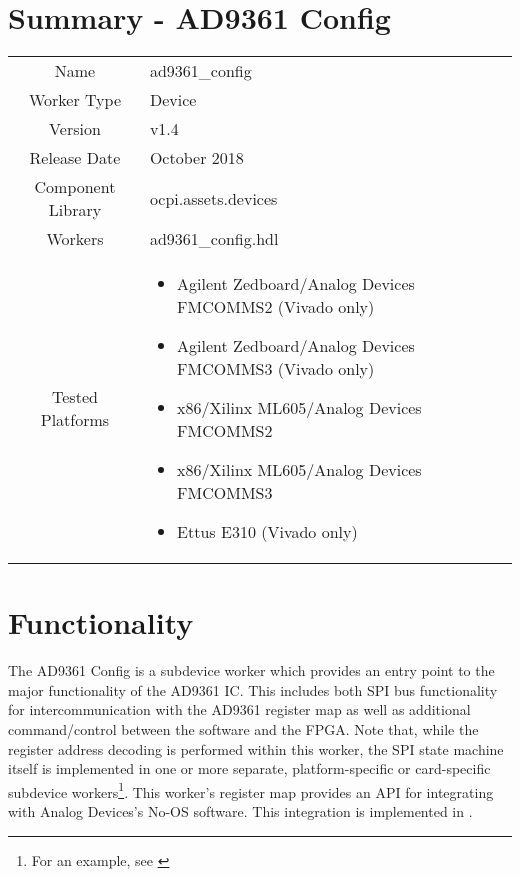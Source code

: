 \documentclass{article}
\author{} %
\date{Version \docVersion} %
\title{\docTitle}
\def\docVersion{1.4}
\def\comp{ad9361\_config}
\def\Comp{AD9361 Config}
\begin{document}
\section*{Summary - \Comp}
\begin{tabular}{|c|M{13.5cm}|}
  \hline
                    &                  \\
  \hline
  Name              & \comp            \\
  \hline
  Worker Type       & Device           \\
  \hline
  Version           & v\docVersion{}   \\
  \hline
  Release Date      & October 2018         \\
  \hline
  Component Library & ocpi.assets.devices     \\
  \hline
  Workers           & \comp.hdl        \\
  \hline
	Tested Platforms  &
\begin{itemize}
  \item Agilent Zedboard/Analog Devices FMCOMMS2 (Vivado only)
  \item Agilent Zedboard/Analog Devices FMCOMMS3 (Vivado only)
  \item x86/Xilinx ML605/Analog Devices FMCOMMS2
  \item x86/Xilinx ML605/Analog Devices FMCOMMS3
  \item Ettus E310 (Vivado only)
\end{itemize} \\
  \hline
\end{tabular}

\section*{Functionality}
  The \Comp{} is a subdevice worker which provides an entry point to the major functionality of the AD9361 IC\cite{ad9361}. This includes both SPI bus functionality for intercommunication with the AD9361 register map as well as additional command/control between the software and the FPGA. Note that, while the register address decoding is performed within this worker, the SPI state machine itself is implemented in one or more separate, platform-specific or card-specific subdevice workers\footnote{For an example, see \cite{spi_comp_datasheet}}. This worker's register map provides an API for integrating with Analog Devices's No-OS software\cite{no_os}. This integration is implemented in \cite{config_proxy_comp_datasheet}.
\end{document}
